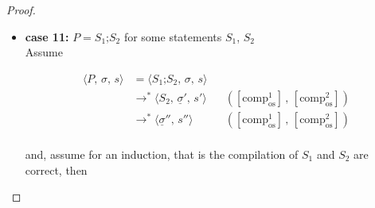\documentclass{article}
\begin{document}
\begin{proof}
\begin{itemize}
\[\begin{aligned}
  &=\langle \mathcal{CA}(a) : \texttt{RET},\, e,\, \sigma'',\, s'',\, \\
  &\quad pc_f + l + 2n+1,\, (pc+n+1) : ras \rangle
  && (\text{definition of } \mathcal{C})   \\
  &\triangleright^\ast \langle \texttt{RET},\, \mathcal{A}(a, \sigma'', s'') : e,\, \\
  &\quad \sigma'',\, s'',\, pc_f + l' + 2n+1,\, (pc+n+1) : ras \rangle
  && (\text{correctness of } \mathcal{CA})   \\
  &\triangleright \langle P[pc+n+1:],\, e,\, \sigma[\texttt{retvar} \mapsto \mathcal{A}(a, \sigma'', s'')],\; \\
  &\quad s[\texttt{retvar} \mapsto s''(a)],\, pc+n+1,\, ras \rangle
  && (\text{operational semantics}) \\
  \end{aligned}
\]

Similar to our proof of the correctness of \texttt{while}-statements, this assumes a finite depth of recursion (0, if there is no recursion) as we have assumed termination. \\



  \item \textbf{case 11:} $P = S_1\texttt{;}S_2$ for some statements $S_1$, $S_2$\\

    Assume

    \[
      \begin{aligned}
      \langle P,\, \sigma,\, s \rangle
      &=\langle S_1\texttt{;}S_2,\, \sigma,\, s \rangle \\
      &\rightarrow^\ast \langle S_2,\, \underline{\sigma}' ,\, s' \rangle
      && ([\text{comp}^1_{\text{os}}] \,,\, [\text{comp}^2_{\text{os}}])   \\
      &\rightarrow^\ast \langle \underline{\sigma}'' ,\, s'' \rangle
      && ([\text{comp}^1_{\text{os}}] \,,\, [\text{comp}^2_{\text{os}}]) \\
      \end{aligned}
  \]
  
  and, assume for an induction, that is the compilation of $S_1$ and $S_2$ are correct, then


\end{itemize}
\end{proof}
\end{document}
